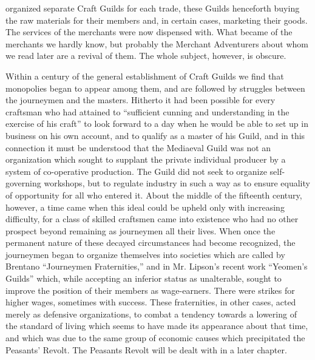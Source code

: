 \documentclass{book}
\begin{document}
organized separate Craft Guilds for each trade, these Guilds henceforth buying the raw materials for their members and, in certain cases, marketing their goods. The services of the merchants were now dispensed with. What became of the merchants we hardly know, but probably the Merchant Adventurers about whom we read later are a revival of them. The whole subject, however, is obscure.

Within a century of the general establishment of Craft Guilds we find that monopolies began to appear among them, and are followed by struggles between the journeymen and the masters. Hitherto it had been possible for every craftsman who had attained to “sufficient cunning and understanding in the exercise of his craft” to look forward to a day when he would be able to set up in business on his own account, and to qualify as a master of his Guild, and in this connection it must be understood that the Mediaeval Guild was not an organization which sought to supplant the private individual producer by a system of co-operative production. The Guild did not seek to organize self-governing workshops, but to regulate industry in such a way as to ensure equality of opportunity for all who entered it. About the middle of the fifteenth century, however, a time came when this ideal could be upheld only with increasing difficulty, for a class of skilled craftsmen came into existence who had no other prospect beyond remaining as journeymen all their lives. When once the permanent nature of these decayed circumstances had become recognized, the journeymen began to organize themselves into societies which are called by Brentano “Journeymen Fraternities,” and in Mr. Lipson’s recent work “Yeomen’s Guilds” which, while accepting an inferior status as unalterable, sought to improve the position of their members as wage-earners. There were strikes for higher wages, sometimes with success. These fraternities, in other cases, acted merely as defensive organizations, to combat a tendency towards a lowering of the standard of living which seems to have made its appearance about that time, and which was due to the same group of economic causes which precipitated the Peasants’ Revolt. The Peasants Revolt will be dealt with in a later chapter.
\end{document}
